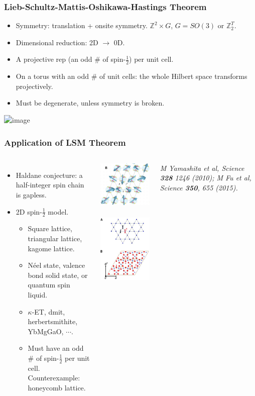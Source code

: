 \documentclass[xcolor=table, 10pt, aspectratio=169]{beamer}
\begin{document}
\begin{frame}
\frametitle{Lieb-Schultz-Mattis-Oshikawa-Hastings Theorem}
\begin{itemize}
\item Symmetry: translation + onsite symmetry. $\mathbb Z^2\times G$, $G = SO(3) \text{ or } \mathbb Z_2^T$.
\item Dimensional reduction: 2D $\rightarrow$ 0D.
\item A projective rep (an odd \# of spin-$\frac12$) per unit cell.
\item On a torus with an odd \# of unit cells: the whole Hilbert space transforms projectively.
\item Must be degenerate, unless symmetry is broken.
\end{itemize}
\begin{center}
  \includegraphics<1>{../dimer/dimer_spin}
\end{center}
\end{frame}

\begin{frame}
\frametitle{Application of LSM Theorem}
\begin{columns}
\begin{itemize}
\item Haldane conjecture: a half-integer spin chain is gapless.
\item 2D spin-$\frac12$ model.
\begin{itemize}
  \item Square lattice, triangular lattice, kagome lattice.
  \item N\'eel state, valence bond solid state, or quantum spin liquid.
  \item $\kappa$-ET, dmit, herbertsmithite, YbMgGaO, $\cdots$.
  \item Must have an odd \# of spin-$\frac12$ per unit cell.\\
  Counterexample: honeycomb lattice.
\end{itemize}\end{itemize}
\begin{center}
  \includegraphics[width=3cm]{../spinexp/dmit}~~~~
  \includegraphics[width=3cm]{../spinexp/herbertsmithite}
\end{center}
\emph{M Yamashita et al, Science \textbf{328} 1246 (2010); \small M Fu et al, Science \textbf{350}, 655 (2015).}
\end{columns}
\end{frame}
\end{document}
